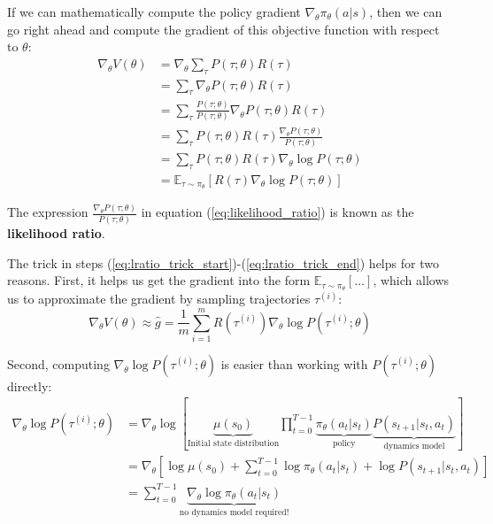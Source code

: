 \documentclass{article}
\newcommand{\E}{\mathbb{E}}                                        %
\begin{document}
If we can mathematically compute the policy gradient $\nabla_\theta \pi_\theta(a|s)$, then we can go right ahead and compute the gradient of this objective function with respect to $\theta$:
\begin{align}
\nabla_\theta V(\theta) &= \nabla_\theta \sum_\tau P(\tau; \theta) R(\tau) \\
&= \sum_\tau \nabla_\theta P(\tau; \theta) R(\tau) \\
&= \sum_\tau \frac{P(\tau; \theta)}{P(\tau; \theta)} \nabla_\theta P(\tau; \theta) R(\tau) \label{eq:lratio_trick_start} \\
&= \sum_\tau P(\tau; \theta) R(\tau) \frac{\nabla_\theta P(\tau; \theta)}{P(\tau; \theta)} \label{eq:likelihood_ratio} \\
&= \sum_\tau P(\tau; \theta) R(\tau) \nabla_\theta \log P(\tau ; \theta) \\
&= \E_{\tau \sim \pi_\theta} \left[ R(\tau) \nabla_\theta \log P(\tau; \theta) \right] \label{eq:lratio_trick_end}
\end{align}

The expression $\frac{\nabla_\theta P(\tau; \theta)}{P(\tau; \theta)}$ in equation (\ref{eq:likelihood_ratio}) is known as the \textbf{likelihood ratio}.

The trick in steps (\ref{eq:lratio_trick_start})-(\ref{eq:lratio_trick_end}) helps for two reasons. First, it helps us get the gradient into the form $\E_{\tau \sim \pi_\theta} [\dots]$, which allows us to approximate the gradient by sampling trajectories $\tau^{(i)}$:
\begin{equation} \label{eq:approx_grad_V}
\nabla_\theta V(\theta) \approx \hat{g}
= \frac{1}{m} \sum_{i=1}^m R(\tau^{(i)}) \nabla_\theta \log P(\tau^{(i)}; \theta)
\end{equation}

Second, computing $\nabla_\theta \log P(\tau^{(i)}; \theta)$ is easier than working with $P(\tau^{(i)}; \theta)$ directly:
\begin{align}
\nabla_\theta \log P(\tau^{(i)};\theta)
&= \nabla_\theta \log \left[\underbrace{\mu(s_0)}_{\text{Initial state distribution}} \prod_{t=0}^{T-1} \underbrace{\pi_\theta(a_t | s_t)}_{\text{policy}} \underbrace{P(s_{t+1} | s_t, a_t)}_{\text{dynamics model}} \right] \\
&= \nabla_\theta \left[ \log \mu(s_0) + \sum_{t=0}^{T-1} \log \pi_\theta(a_t | s_t) + \log P(s_{t+1} | s_t, a_t) \right] \\
&= \sum_{t=0}^{T-1} \underbrace{\nabla_\theta \log \pi_\theta(a_t | s_t)}_{\text{no dynamics model required!}} \label{eq:grad_log_p}
\end{align}
\end{document}
